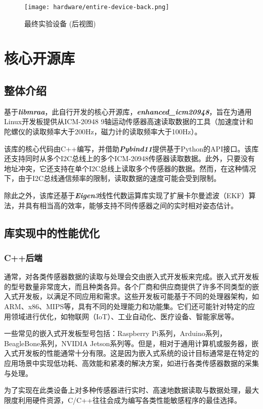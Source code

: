 \begin{figure}[H]
    \centering
    \texttt{[image: hardware/entire-device-back.png]}
    \caption{\label{fig:entire-device-back}最终实验设备 (后视图)}
\end{figure}

\cleardoublepage
\section{核心开源库}
\subsection{整体介绍}
基于{\textbf \itshape libmraa}，此自行开发的核心开源库，{\textbf \itshape enhanced\_icm20948}，旨在为通用Linux开发板提供从ICM-20948 9轴运动传感器高速读取数据的工具（加速度计和陀螺仪的读取频率大于200Hz，磁力计的读取频率大于100Hz）。

该库的核心代码由C++编写，并借助{\bfseries \itshape Pybind11}提供基于Python的API接口。该库还支持同时从多个I2C总线上的多个ICM-20948传感器读取数据。此外，只要没有地址冲突，它还支持在单个I2C总线上读取多个传感器的数据。然而，在这种情况下，由于I2C总线通信频率的限制，读取数据的速度可能会受到限制。

除此之外，该库还基于{\bfseries \itshape Eigen3}线性代数运算库实现了扩展卡尔曼滤波（EKF）算法，并具有相当高的效率，能够支持不同传感器之间的实时相对姿态估计。

\subsection{库实现中的性能优化}
\subsubsection{C++后端}
通常，对各类传感器数据的读取与处理会交由嵌入式开发板来完成。嵌入式开发板的型号数量非常庞大，而且种类各异。各个厂商和供应商提供了许多不同类型的嵌入式开发板，以满足不同应用和需求。这些开发板可能基于不同的处理器架构，如ARM、x86、MIPS等，具有不同的处理能力和功能集。它们还可能针对特定的应用领域进行优化，如物联网（IoT）、工业自动化、医疗设备、智能家居等。

一些常见的嵌入式开发板型号包括：Raspberry Pi系列，Arduino系列，BeagleBone系列，NVIDIA Jetson系列等。但是，相对于通用计算机或服务器，嵌入式开发板的性能通常十分有限。这是因为嵌入式系统的设计目标通常是在特定的应用场景中实现低功耗、高效能和紧凑的解决方案，如进行各类传感器数据的采集与处理。

为了实现在此类设备上对多种传感器进行实时、高速地数据读取与数据处理，最大限度利用硬件资源，C/C++往往会成为编写各类性能敏感程序的最佳选择。

